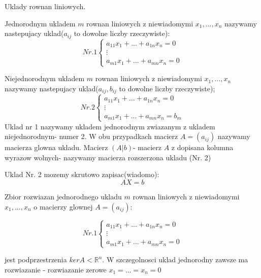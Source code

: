 \documentclass{article}
\begin{document}
\vspace{10mm}

Uklady rownan liniowych.

\begin{tcolorbox}[colback=white!90!red,colframe=black!35!red,title=Definicja 2.41 Uklady rownan liniowych]

Jednorodnym ukladem $m$ rownan liniowych z niewiadomymi $x_{1},...,x_{n}$ nazywamy nastepujacy uklad($a_{ij}$ to dowolne liczby rzeczywiste):
$$
Nr. 1
\begin{cases}
a_{11}x_{1} + ... + a_{1n}x_{n} = 0 \\
\vdots \\
a_{m1}x_{1} + ... + a_{mn}x_{n} = 0
\end{cases}
$$

Niejednorodnym ukladem $m$ rownan liniowych z niewiadomymi $x_{1},...,x_{n}$ nazywamy nastepujacy uklad($a_{ij}, b_{ij}$ to dowolne liczby rzeczywiste);
$$
Nr. 2
\begin{cases}
a_{11}x_{1} + ... + a_{1n}x_{n} = 0 \\
\vdots \\
a_{m1}x_{1} + ... + a_{mn}x_{n} = b_{m}
\end{cases}
$$
Uklad nr 1 nazywamy ukladem jednorodnym zwiazanym z ukladem niejednorodnym- numer 2.
W obu przypadkach macierz $A = (a_{ij})$ nazywamy macierza glowna ukladu. Macierz $(A|b)$- macierz $A$ z dopisana kolumna wyrazow wolnych- nazywamy macierza rozszerzona ukladu (Nr. 2)

Uklad Nr. 2 mozemy skrutowo zapisac(wiadomo):$$AX = b$$
\end{tcolorbox}


\begin{tcolorbox}[colback=white!90!green,colframe=black!35!green,title=Zbior rozwiazan ukladu jednorodnego]
    
Zbior rozwiazan jednorodnego ukladu $m$ rownan liniowych z niewiadomymi $x_{1},...,x_{n}$ o macierzy glownej $A = (a_{ij})$:

$$
Nr. 1
\begin{cases}
a_{11}x_{1} + ... + a_{1n}x_{n} = 0 \\
\vdots \\
a_{m1}x_{1} + ... + a_{mn}x_{n} = 0
\end{cases}
$$

jest podprzestrzenia $kerA < \mathbb{R}^{n}$. W szczegolnosci uklad jednorodny zawsze ma rozwiazanie - rozwiazanie zerowe $x_{1} = ... = x_{n} = 0$

\end{tcolorbox}
\end{document}
